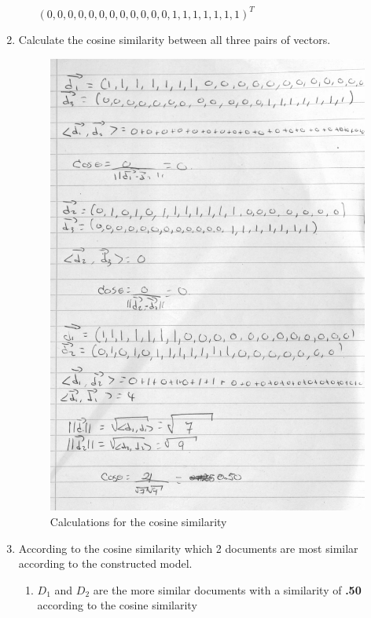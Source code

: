 \documentclass{WeSTassignment}
\begin{document}
\begin{enumerate}
\begin{enumerate}
\\$(0,0,0,0,0,0,0,0,0,0,0,0,1,1,1,1,1,1,1)^{T}$
\end{enumerate}
\item Calculate the cosine similarity between all three pairs of vectors.
\begin{figure}[h]
  \centering
  \includegraphics[scale=0.5]{exercise1.png}
   \caption{Calculations for the cosine similarity}
     \label{fig:dig} 
\end{figure}
\item According to the cosine similarity which 2 documents are most similar according to the constructed model. 
\begin{enumerate}
\item $D_1$ and $D_2$ are the more similar documents with a similarity of \textbf{.50} according to the cosine similarity
\end{enumerate}
\end{enumerate}
\end{document}
